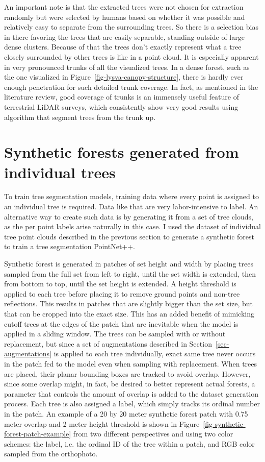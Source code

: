 An important note is that the extracted trees were not chosen for extraction randomly but were selected by humans based on whether it was possible and relatively easy to separate from the surrounding trees.
So there is a selection bias in there favoring the trees that are easily separable, standing outside of large dense clusters.
Because of that the trees don't exactly represent what a tree closely surrounded by other trees is like in a point cloud.
It is especially apparent in very pronounced trunks of all the visualized trees.
In a dense forest, such as the one visualized in Figure~\ref{fig-lysva-canopy-structure}, there is hardly ever enough penetration for such detailed trunk coverage.
In fact, as mentioned in the literature review, good coverage of trunks is an immensely useful feature of terrestrial LiDAR surveys, which consistently show very good results using algorithm that segment trees from the trunk up.

\section{Synthetic forests generated from individual trees}\label{sec-synthetic-forest-dataset}

To train tree segmentation models, training data where every point is assigned to an individual tree is required.
Data like that are very labor-intensive to label.
An alternative way to create such data is by generating it from a set of tree clouds, as the per point labels arise naturally in this case.
I used the dataset of individual tree point clouds described in the previous section to generate a synthetic forest to train a tree segmentation PointNet++.

Synthetic forest is generated in patches of set height and width by placing trees sampled from the full set from left to right, until the set width is extended, then from bottom to top, until the set height is extended.
A height threshold is applied to each tree before placing it to remove ground points and non-tree reflections.
This results in patches that are slightly bigger than the set size, but that can be cropped into the exact size.
This has an added benefit of mimicking cutoff trees at the edges of the patch that are inevitable when the model is applied in a sliding window.
The trees can be sampled with or without replacement, but since a set of augmentations described in Section~\ref{sec-augmentations} is applied to each tree individually, exact same tree never occurs in the patch fed to the model even when sampling with replacement.
When trees are placed, their planar bounding boxes are tracked to avoid overlap.
However, since some overlap might, in fact, be desired to better represent actual forests, a parameter that controls the amount of overlap is added to the dataset generation process.
Each tree is also assigned a label, which simply tracks its ordinal number in the patch.
An example of a 20 by 20 meter synthetic forest patch with 0.75 meter overlap and 2 meter height threshold is shown in Figure~\ref{fig-synthetic-forest-patch-example} from two different perspectives and using two color schemes: the label, i.e. the ordinal ID of the tree within a patch, and RGB color sampled from the orthophoto.

